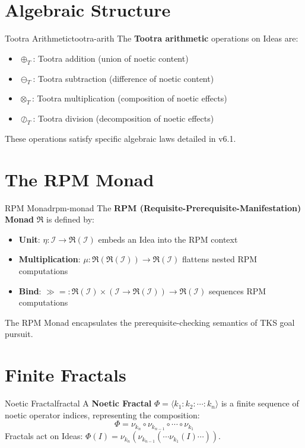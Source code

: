 \documentclass[11pt,twoside,openright]{book}
\theoremstyle{definition}
\theoremstyle{plain}
\theoremstyle{remark}
\newcommand{\Ideas}{\mathcal{I}}
\newcommand{\Tadd}{\oplus_T}
\newcommand{\Tsub}{\ominus_T}
\newcommand{\Tmul}{\otimes_T}
\newcommand{\Tdiv}{\oslash_T}
\newcommand{\RPM}{\mathfrak{R}}
\newcommand{\rpmbind}{\mathbin{\gg\!=}}
\newcommand{\Frac}{\Phi}
\begin{document}
\section{Algebraic Structure}

\begin{definitionbox*}{Tootra Arithmetic}{tootra-arith}
The \textbf{Tootra arithmetic} operations on Ideas are:
\begin{itemize}
    \item $\Tadd$: Tootra addition (union of noetic content)
    \item $\Tsub$: Tootra subtraction (difference of noetic content)
    \item $\Tmul$: Tootra multiplication (composition of noetic effects)
    \item $\Tdiv$: Tootra division (decomposition of noetic effects)
\end{itemize}
These operations satisfy specific algebraic laws detailed in v6.1.
\end{definitionbox*}

\section{The RPM Monad}

\begin{definitionbox*}{RPM Monad}{rpm-monad}
The \textbf{RPM (Requisite-Prerequisite-Manifestation) Monad} $\RPM$ is defined by:
\begin{itemize}
    \item \textbf{Unit}: $\eta : \Ideas \to \RPM(\Ideas)$ embeds an Idea into the RPM context
    \item \textbf{Multiplication}: $\mu : \RPM(\RPM(\Ideas)) \to \RPM(\Ideas)$ flattens nested RPM computations
    \item \textbf{Bind}: $\rpmbind : \RPM(\Ideas) \times (\Ideas \to \RPM(\Ideas)) \to \RPM(\Ideas)$ sequences RPM computations
\end{itemize}
The RPM Monad encapsulates the prerequisite-checking semantics of TKS goal pursuit.
\end{definitionbox*}

\section{Finite Fractals}

\begin{definitionbox*}{Noetic Fractal}{fractal}
A \textbf{Noetic Fractal} $\Frac = \langle k_1 : k_2 : \cdots : k_n \rangle$ is a finite sequence of noetic operator indices, representing the composition:
\[
\Frac = \nu_{k_n} \circ \nu_{k_{n-1}} \circ \cdots \circ \nu_{k_1}
\]
Fractals act on Ideas: $\Frac(I) = \nu_{k_n}(\nu_{k_{n-1}}(\cdots \nu_{k_1}(I) \cdots))$.
\end{definitionbox*}
\end{document}
